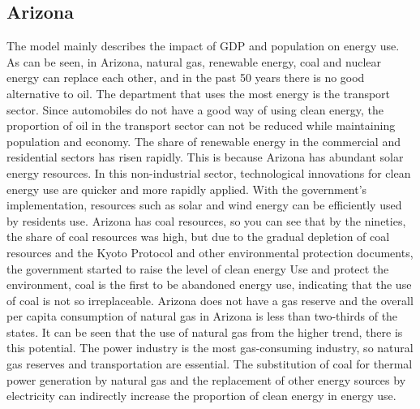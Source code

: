 \documentclass{mcmthesis}
\begin{document}
\subsection{Arizona}
The model mainly describes the impact of GDP and population on energy use. As can be seen, in Arizona, natural gas, renewable energy, coal and nuclear energy can replace each other, and in the past 50 years there is no good alternative to oil. The department that uses the most energy is the transport sector. Since automobiles do not have a good way of using clean energy, the proportion of oil in the transport sector can not be reduced while maintaining population and economy. The share of renewable energy in the commercial and residential sectors has risen rapidly. This is because Arizona has abundant solar energy resources. In this non-industrial sector, technological innovations for clean energy use are quicker and more rapidly applied. With the government's implementation, resources such as solar and wind energy can be efficiently used by residents use. Arizona has coal resources, so you can see that by the nineties, the share of coal resources was high, but due to the gradual depletion of coal resources and the Kyoto Protocol and other environmental protection documents, the government started to raise the level of clean energy Use and protect the environment, coal is the first to be abandoned energy use, indicating that the use of coal is not so irreplaceable. Arizona does not have a gas reserve and the overall per capita consumption of natural gas in Arizona is less than two-thirds of the states. It can be seen that the use of natural gas from the higher trend, there is this potential. The power industry is the most gas-consuming industry, so natural gas reserves and transportation are essential. The substitution of coal for thermal power generation by natural gas and the replacement of other energy sources by electricity can indirectly increase the proportion of clean energy in energy use.
\end{document}
